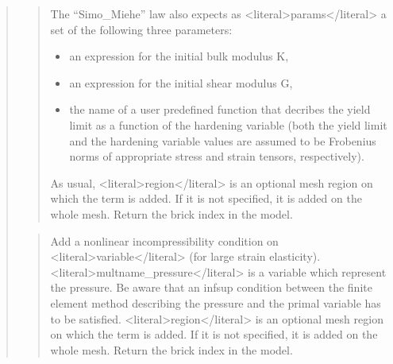 \documentclass[a4paper,11pt,english]{sphinxmanual}
\begin{document}
\begin{quote}
\begin{quote}
\sphinxAtStartPar
The  “Simo\_Miehe” law also expects as \textless{}literal\textgreater{}params\textless{}/literal\textgreater{} a set of the
following three parameters:
\begin{itemize}
\item {} 
\sphinxAtStartPar
an expression for the initial bulk modulus K,

\item {} 
\sphinxAtStartPar
an expression for the initial shear modulus G,

\item {} 
\sphinxAtStartPar
the name of a user predefined function that decribes
the yield limit as a function of the hardening variable
(both the yield limit and the hardening variable values are
assumed to be Frobenius norms of appropriate stress and strain
tensors, respectively).

\end{itemize}

\sphinxAtStartPar
As usual, \textless{}literal\textgreater{}region\textless{}/literal\textgreater{} is an optional mesh region on which the term is added.
If it is not specified, it is added on the whole mesh.
Return the brick index in the model.
\end{quote}

\sphinxAtStartPar
{}
\begin{quote}

\sphinxAtStartPar
Add a nonlinear incompressibility condition on \textless{}literal\textgreater{}variable\textless{}/literal\textgreater{} (for large
strain elasticity). \textless{}literal\textgreater{}multname\_pressure\textless{}/literal\textgreater{}
is a variable which represent the pressure. Be aware that an inf\sphinxhyphen{}sup
condition between the finite element method describing the pressure and the
primal variable has to be satisfied. \textless{}literal\textgreater{}region\textless{}/literal\textgreater{} is an optional mesh region on
which the term is added. If it is not specified, it is added on the
whole mesh. Return the brick index in the model.
\end{quote}

\sphinxAtStartPar
{}
\begin{quote}


\end{quote}
\end{quote}
\end{document}
